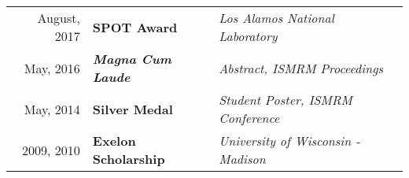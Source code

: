 
\begin{minipage}{\textwidth}
\begin{tabular}{r|ll}
	August, 2017 &	\textbf{SPOT Award} & \textit{Los Alamos National Laboratory} \\
	May, 2016 & \textit{\textbf{Magna Cum Laude}} & \textit{Abstract, ISMRM Proceedings} \\
	May, 2014 & \textbf{Silver Medal} & \textit{Student Poster, ISMRM Conference} \\
	2009, 2010 & \textbf{Exelon Scholarship} & \textit{University of Wisconsin - Madison} \\
\end{tabular}
\end{minipage}
